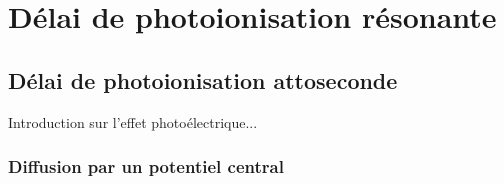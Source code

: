 \part{Délai de photoionisation résonante}
\chapter{Délai de photoionisation attoseconde}
\label{chap:DelaiPI}
Introduction sur l'effet photoélectrique...

\section{Diffusion par un potentiel central}
\label{sec:DiffusionPotentielCentral}

